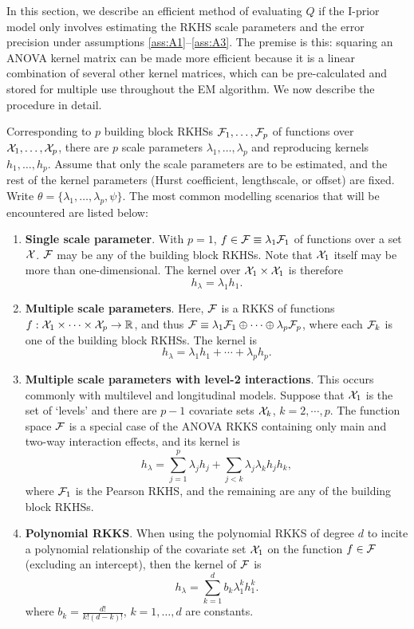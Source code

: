 In this section, we describe an efficient method of evaluating $Q$ if the I-prior model only involves estimating the RKHS scale parameters and the error precision under assumptions \ref{ass:A1}--\ref{ass:A3}.
The premise is this: squaring an ANOVA kernel matrix can be made more efficient because it is a linear combination of several other kernel matrices, which can be pre-calculated and stored for multiple use throughout the EM algorithm.
We now describe the procedure in detail.

Corresponding to $p$ building block RKHSs ${\mathcal F}_1,\dots,{\mathcal F}_p$ of functions over ${\mathcal X}_1,\dots,{\mathcal X}_p$, there are $p$ scale parameters $\lambda_1,\dots,\lambda_p$ and reproducing kernels $h_1,\dots,h_p$.
Assume that only the scale parameters are to be estimated, and the rest of the kernel parameters (Hurst coefficient, lengthscale, or offset) are fixed.
Write $\theta = \{\lambda_1,\dots,\lambda_p,\psi\}$.
The most common modelling scenarios that will be encountered are listed below:
\begin{enumerate}
  \item \textbf{Single scale parameter}. With $p=1$, $f\in{\mathcal F}\equiv \lambda_1{\mathcal F}_1$ of functions over a set ${\mathcal X}$. ${\mathcal F}$ may be any of the building block RKHSs. Note that ${\mathcal X}_1$ itself may be more than one-dimensional. The kernel over ${\mathcal X}_1\times{\mathcal X}_1$ is therefore
  \[
    h_\lambda = \lambda_1 h_1.
  \]
  \item \textbf{Multiple scale parameters}. Here, ${\mathcal F}$ is a RKKS of functions $f:{\mathcal X}_1\times\cdots\times{\mathcal X}_p\to\mathbb{R}$, and thus ${\mathcal F}\equiv \lambda_1{\mathcal F}_1 \oplus \cdots \oplus \lambda_p{\mathcal F}_p$, where each ${\mathcal F}_k$ is one of the building block RKHSs. The kernel is
  \[
    h_\lambda = \lambda_1 h_1 + \cdots + \lambda_p h_p.
  \]
  \item \textbf{Multiple scale parameters with level-2 interactions}. This occurs commonly with multilevel and longitudinal models. Suppose that ${\mathcal X}_1$ is the set of `levels' and there are $p-1$ covariate sets ${\mathcal X}_k$, $k=2,\cdots,p$. The function space ${\mathcal F}$ is a special case of the ANOVA RKKS containing only main and two-way interaction effects, and its kernel is
  \[
    h_\lambda = \sum_{j=1}^p \lambda_j h_j + \sum_{j < k} \lambda_j\lambda_k h_j h_k,
  \]
  where ${\mathcal F}_1$ is the Pearson RKHS, and the remaining are any of the building block RKHSs.
  \item \textbf{Polynomial RKKS}. When using the polynomial RKKS of degree $d$ to incite a polynomial relationship of the covariate set ${\mathcal X}_1$ on the function $f\in{\mathcal F}$ (excluding an intercept), then the kernel of ${\mathcal F}$ is
  \[
    h_\lambda = \sum_{k=1}^d b_k \lambda_1^k h_1^k.
  \]
  where $b_k = \frac{d!}{k!(d-k)!}$, $k=1,\dots,d$ are constants.
\end{enumerate}
